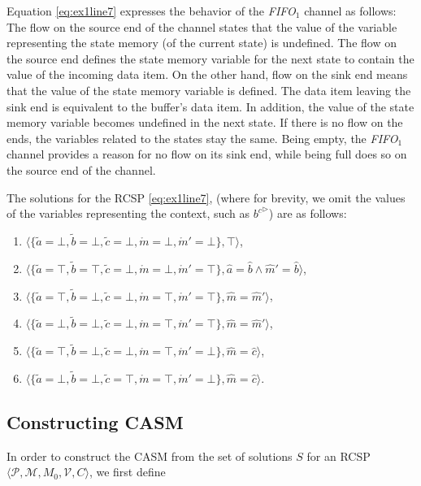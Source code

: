 Equation \ref{eq:ex1line7} expresses the behavior of  the \emph{FIFO}$_1$ channel as follows: The flow on the source end of the channel states that the value of the variable representing the state memory (of the current state) is undefined. The flow on the source end defines the state memory variable for the next state to contain the value of the incoming data item. On the other hand, flow on the sink end means that the value of the state memory variable is defined. The data item leaving the sink end is equivalent to the buffer's data item. In addition, the value of the state memory variable becomes undefined in the next state. If there is no flow on the ends, the variables related to the states stay the same. Being empty, the \emph{FIFO}$_1$ channel provides a reason for no flow on its sink end, while being full does so on the source end of the channel.

The solutions for the RCSP \ref{eq:ex1line7}, (where for brevity, we omit the values of the variables representing the context, such as ${b^c}^\triangleright$) are as follows:

\begin{enumerate}
\label{eq:solutionex2}
\item $\langle\{\tilde{a}=\bot, \tilde{b}=\bot, \tilde{c}=\bot, \mathring{m}=\bot, \mathring{m}'=\bot\}, \top\rangle$,
\item $\langle\{\tilde{a}=\top, \tilde{b}=\top, \tilde{c}=\bot, \mathring{m}=\bot, \mathring{m}'=\top\},  \hat{a}=\hat{b} \wedge \hat{m}'=\hat{b}\rangle$,
\item $\langle\{\tilde{a}=\top, \tilde{b}=\bot, \tilde{c}=\bot, \mathring{m}=\top, \mathring{m}'=\top\}, \hat{m}=\hat{m}'\rangle$,
\item $\langle\{\tilde{a}=\bot, \tilde{b}=\bot, \tilde{c}=\bot, \mathring{m}=\top, \mathring{m}'=\top\}, \hat{m}=\hat{m}'\rangle$,
\item $\langle\{\tilde{a}=\top, \tilde{b}=\bot, \tilde{c}=\bot, \mathring{m}=\top, \mathring{m}'=\bot\},  \hat{m}=\hat{c}\rangle$,
\item $\langle\{\tilde{a}=\bot, \tilde{b}=\bot, \tilde{c}=\top, \mathring{m}=\top, \mathring{m}'=\bot\}, \hat{m}=\hat{c}\rangle$.
\end{enumerate}

\subsection{Constructing CASM}
In order to construct the CASM from the set of solutions $S$ for an RCSP $\langle \mathcal{P}, \mathcal{M}, M_0,  \mathcal{V}, C \rangle$, we first define

